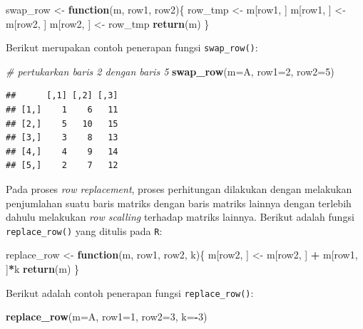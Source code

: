 \documentclass[
]{book}
\newenvironment{Shaded}{\begin{snugshade}}{\end{snugshade}}
\newcommand{\AttributeTok}[1]{\textcolor[rgb]{0.13,0.29,0.53}{#1}}
\newcommand{\CommentTok}[1]{\textcolor[rgb]{0.56,0.35,0.01}{\textit{#1}}}
\newcommand{\ControlFlowTok}[1]{\textcolor[rgb]{0.13,0.29,0.53}{\textbf{#1}}}
\newcommand{\DecValTok}[1]{\textcolor[rgb]{0.00,0.00,0.81}{#1}}
\newcommand{\FunctionTok}[1]{\textcolor[rgb]{0.13,0.29,0.53}{\textbf{#1}}}
\newcommand{\NormalTok}[1]{#1}
\newcommand{\OtherTok}[1]{\textcolor[rgb]{0.56,0.35,0.01}{#1}}
\newcommand{\SpecialCharTok}[1]{\textcolor[rgb]{0.81,0.36,0.00}{\textbf{#1}}}
\theoremstyle{definition}
\theoremstyle{definition}
\theoremstyle{definition}
\theoremstyle{definition}
\theoremstyle{remark}
\begin{document}
\begin{Shaded}
\begin{Highlighting}[]
\NormalTok{swap\_row }\OtherTok{\textless{}{-}} \ControlFlowTok{function}\NormalTok{(m, row1, row2)\{}
\NormalTok{  row\_tmp }\OtherTok{\textless{}{-}}\NormalTok{ m[row1, ]}
\NormalTok{  m[row1, ] }\OtherTok{\textless{}{-}}\NormalTok{ m[row2, ]}
\NormalTok{  m[row2, ] }\OtherTok{\textless{}{-}}\NormalTok{ row\_tmp}
  \FunctionTok{return}\NormalTok{(m)}
\NormalTok{\}}
\end{Highlighting}
\end{Shaded}

Berikut merupakan contoh penerapan fungsi \texttt{swap\_row()}:

\begin{Shaded}
\begin{Highlighting}[]
\CommentTok{\# pertukarkan baris 2 dengan baris 5}
\FunctionTok{swap\_row}\NormalTok{(}\AttributeTok{m=}\NormalTok{A, }\AttributeTok{row1=}\DecValTok{2}\NormalTok{, }\AttributeTok{row2=}\DecValTok{5}\NormalTok{)}
\end{Highlighting}
\end{Shaded}

\begin{verbatim}
##      [,1] [,2] [,3]
## [1,]    1    6   11
## [2,]    5   10   15
## [3,]    3    8   13
## [4,]    4    9   14
## [5,]    2    7   12
\end{verbatim}

Pada proses \emph{row replacement}, proses perhitungan dilakukan dengan melakukan penjumlahan suatu baris matriks dengan baris matriks lainnya dengan terlebih dahulu melakukan \emph{row scalling} terhadap matriks lainnya. Berikut adalah fungsi \texttt{replace\_row()} yang ditulis pada \texttt{R}:

\begin{Shaded}
\begin{Highlighting}[]
\NormalTok{replace\_row }\OtherTok{\textless{}{-}} \ControlFlowTok{function}\NormalTok{(m, row1, row2, k)\{}
\NormalTok{  m[row2, ] }\OtherTok{\textless{}{-}}\NormalTok{ m[row2, ] }\SpecialCharTok{+}\NormalTok{ m[row1, ]}\SpecialCharTok{*}\NormalTok{k}
  \FunctionTok{return}\NormalTok{(m)}
\NormalTok{\}}
\end{Highlighting}
\end{Shaded}

Berikut adalah contoh penerapan fungsi \texttt{replace\_row()}:

\begin{Shaded}
\begin{Highlighting}[]
\FunctionTok{replace\_row}\NormalTok{(}\AttributeTok{m=}\NormalTok{A, }\AttributeTok{row1=}\DecValTok{1}\NormalTok{, }\AttributeTok{row2=}\DecValTok{3}\NormalTok{, }\AttributeTok{k=}\SpecialCharTok{{-}}\DecValTok{3}\NormalTok{)}
\end{Highlighting}
\end{Shaded}
\end{document}
